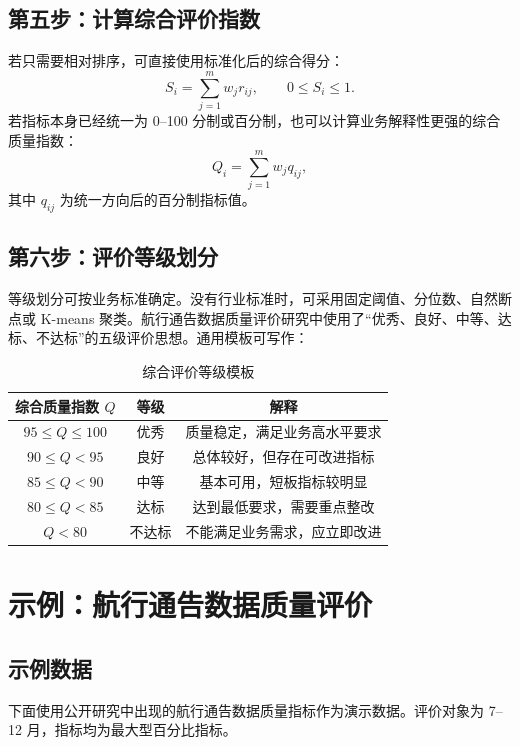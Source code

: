 \documentclass[UTF8,zihao=-4]{ctexart}
\begin{document}
\subsection{第五步：计算综合评价指数}
若只需要相对排序，可直接使用标准化后的综合得分：
\begin{equation}
S_i=\sum_{j=1}^{m} w_j r_{ij},\qquad 0\le S_i\le 1.
\end{equation}
若指标本身已经统一为 0--100 分制或百分制，也可以计算业务解释性更强的综合质量指数：
\begin{equation}
Q_i=\sum_{j=1}^{m}w_j q_{ij},
\end{equation}
其中 $q_{ij}$ 为统一方向后的百分制指标值。

\subsection{第六步：评价等级划分}
等级划分可按业务标准确定。没有行业标准时，可采用固定阈值、分位数、自然断点或 K-means 聚类。航行通告数据质量评价研究中使用了“优秀、良好、中等、达标、不达标”的五级评价思想\cite{li2022notam}。通用模板可写作：

\begin{table}[H]
\centering
\caption{综合评价等级模板}
\begin{tabular}{ccc}
\toprule
综合质量指数 $Q$ & 等级 & 解释 \\
\midrule
$95\le Q\le 100$ & 优秀 & 质量稳定，满足业务高水平要求 \\
$90\le Q<95$ & 良好 & 总体较好，但存在可改进指标 \\
$85\le Q<90$ & 中等 & 基本可用，短板指标较明显 \\
$80\le Q<85$ & 达标 & 达到最低要求，需要重点整改 \\
$Q<80$ & 不达标 & 不能满足业务需求，应立即改进 \\
\bottomrule
\end{tabular}
\end{table}

\section{示例：航行通告数据质量评价}

\subsection{示例数据}
下面使用公开研究中出现的航行通告数据质量指标作为演示数据。评价对象为 7--12 月，指标均为最大型百分比指标。
\end{document}
